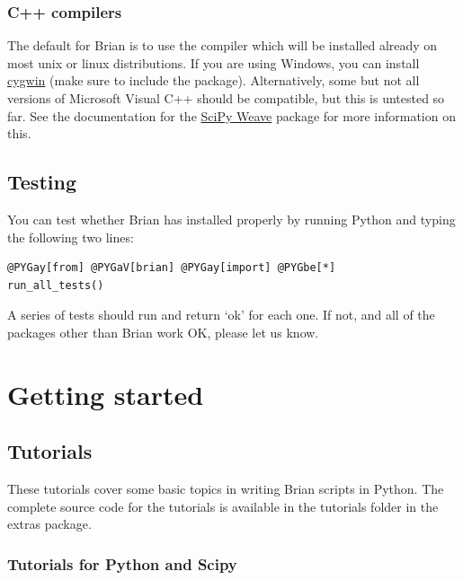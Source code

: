 \documentclass[letterpaper,10pt]{manual}
\begin{document}
\subsection{C++ compilers}

The default for Brian is to use the  compiler which will
be installed already on most unix or linux distributions. If you are using Windows, you can
install \href{http://www.cygwin.com/}{cygwin} (make sure to include the  package). Alternatively,
some but not all versions of Microsoft Visual C++ should be compatible, but this is untested
so far. See the documentation for the \href{http://www.scipy.org/Weave}{SciPy Weave} package for
more information on this.


\section{Testing}

You can test whether Brian has installed properly by running Python and typing
the following two lines:

\begin{Verbatim}[commandchars=@\[\]]
@PYGay[from] @PYGaV[brian] @PYGay[import] @PYGbe[*]
run_all_tests()
\end{Verbatim}

A series of tests should run and return `ok' for each one. If not, and all of the packages other than
Brian work OK, please let us know.

\resetcurrentobjects


\chapter{Getting started}

\resetcurrentobjects


\section{Tutorials}

These tutorials cover some basic topics in writing Brian scripts in Python. The
complete source code for the tutorials is available in the tutorials folder
in the extras package.

\resetcurrentobjects


\subsection{Tutorials for Python and Scipy}
\end{document}
